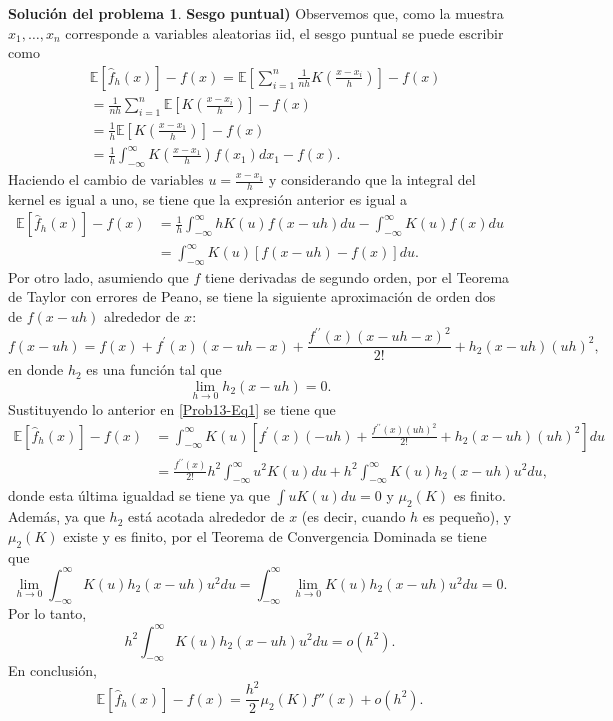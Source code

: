 \documentclass[twoside,12pt]{article}
\theoremstyle{definition}
\newtheorem{soln}{Solución del problema}
\begin{document}
\begin{soln}
\textbf{Sesgo puntual)} Observemos que, como la muestra $x_1, \ldots, x_n$ corresponde a variables aleatorias iid, el sesgo puntual se puede escribir como
\[
\begin{split}
  & \mathbb{E}\left[\hat{f}_h(x)\right]-f(x)=\mathbb{E}\left[\sum_{i=1}^n \frac{1}{n h} K\left(\frac{x-x_i}{h}\right)\right]-f(x) \\
  &=  \frac{1}{n h} \sum_{i=1}^n \mathbb{E}\left[K\left(\frac{x-x_i}{h}\right)\right]-f(x) \\
  &=  \frac{1}{h} \mathbb{E}\left[K\left(\frac{x-x_1}{h}\right)\right]-f(x) \\
  &=  \frac{1}{h} \int_{-\infty}^{\infty} K\left(\frac{x-x_1}{h}\right) f\left(x_1\right) d x_1-f(x).
\end{split}
\] 
Haciendo el cambio de variables $u=\frac{x-x_1}{h}$ y considerando que la integral del kernel es igual a uno, se tiene que la expresión anterior es igual a
\begin{equation}\label{Prob13-Eq1}
  \begin{split}
  \mathbb{E}\left[\hat{f}_h(x)\right]-f(x) &= \frac{1}{h} \int_{-\infty}^{\infty} h K(u) f(x-u h) d u-\int_{-\infty}^{\infty} K(u) f(x) d u \\
  & = \int_{-\infty}^{\infty} K(u)[f(x-u h)-f(x)] d u.
\end{split}
\end{equation}
Por otro lado, asumiendo que $f$ tiene derivadas de segundo orden, por el Teorema de Taylor con errores de Peano, se tiene la siguiente aproximación de orden dos de $f(x-uh)$ alrededor de $x$:
\[
f(x-u h)=f(x)+f^{\prime}(x)(x-u h-x)+\frac{f^{\prime \prime}(x){(x-u h-x)}^2}{2!}+h_2(x-uh){(uh)}^2,
\]
en donde $h_2$ es una función tal que
\[
\lim_{h\to 0}h_2(x-uh)=0.
\]
Sustituyendo lo anterior en \eqref{Prob13-Eq1} se tiene que
\[
\begin{split}
  \mathbb{E}\left[\hat{f}_h(x)\right]-f(x) &= \int_{-\infty}^{\infty} K(u)\left[f^{\prime}(x)(-u h)+\frac{f^{\prime \prime}(x){(u h)}^2}{2!}+h_2(x-uh){(uh)}^2\right] d u \\
  &=  \frac{f^{\prime \prime}(x)}{2!} h^2 \int_{-\infty}^{\infty} u^2 K(u) d u+h^2 \int_{-\infty}^{\infty} K(u) h_2(x-uh) u^2  d u,
\end{split}
\]
donde esta última igualdad se tiene ya que $\int uK(u)du=0$ y $\mu_2(K)$ es finito. Además, ya que $h_2$ está acotada alrededor de $x$ (es decir, cuando $h$ es pequeño), y $\mu_2(K)$ existe y es finito, por el Teorema de Convergencia Dominada se tiene que
\[
\lim_{h\to 0} \int_{-\infty}^{\infty} K(u) h_2(x-uh) u^2  d u = \int_{-\infty}^{\infty} \lim_{h\to 0} K(u) h_2(x-uh) u^2  d u = 0.
\]
Por lo tanto,
\[
h^2 \int_{-\infty}^{\infty} K(u) h_2(x-uh) u^2  d u = o(h^2).
\]
En conclusión,
\[
\mathbb{E}\left[\hat{f}_h(x)\right]-f(x) = \frac{h^2}{2}\mu_2(K)f''(x)+o(h^2).
\]
\end{soln}
\end{document}
